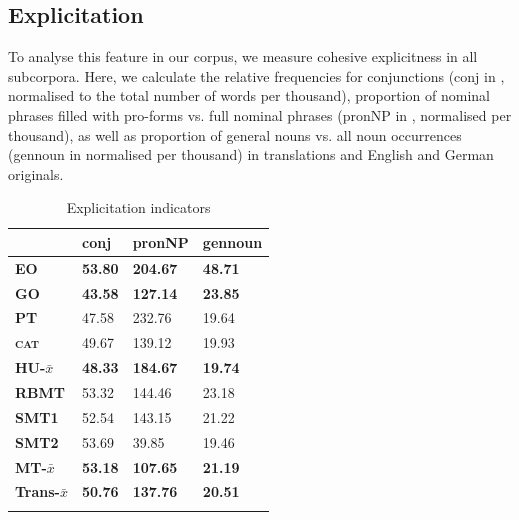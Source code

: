 \documentclass[output=paper]{LSP/langsci}
\begin{document}
\subsection{Explicitation}

To analyse this feature in our corpus, we measure cohesive explicitness in all subcorpora. Here, we calculate the relative frequencies for conjunctions (conj in , normalised to the total number of words per thousand), proportion of nominal phrases filled with pro-forms vs. full nominal phrases (pronNP in , normalised per thousand), as well as proportion of general nouns vs. all noun occurrences (gennoun in  normalised per thousand) in translations and English and German originals.

\begin{table}
     \centering
     \begin{tabular}{llll}
\lsptoprule
              & \textbf{conj}         & \textbf{pronNP}  & \textbf{gennoun} \\ \midrule
\textbf{EO}    & \textbf{53.80}     & \textbf{204.67} & \textbf{48.71} \\ 
\textbf{GO}    & \textbf{43.58}     & \textbf{127.14} & \textbf{23.85} \\ 
\textbf{PT}    & 47.58		        & 232.76          & 19.64 \\
\textbf{\textsc{cat}}   & 49.67		        & 139.12          & 19.93  \\ 
\textbf{HU-$\bar{x}$}    & \textbf{48.33}     & \textbf{184.67}   & \textbf{19.74}\\ 
\textbf{RBMT}  & 53.32		        & 144.46          & 23.18 \\
\textbf{SMT1}  & 52.54		        & 143.15          & 21.22 \\
\textbf{SMT2}  & 53.69		        & 39.85           & 19.46 \\ 
\textbf{MT-$\bar{x}$} & \textbf{53.18}  & \textbf{107.65}  & \textbf{21.19} \\ 
\textbf{Trans-$\bar{x}$} & \textbf{50.76}  & \textbf{137.76}  & \textbf{20.51} \\ 
\lspbottomrule
     \end{tabular}

 \caption{Explicitation indicators}
     \label{tab:4.3}
\end{table}
\end{document}
